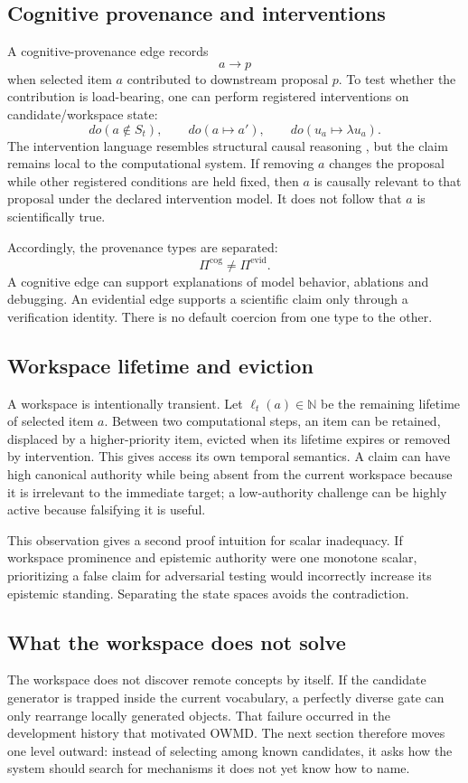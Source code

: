 \subsection{Cognitive provenance and interventions}

A cognitive-provenance edge records
\[
a\longrightarrow p
\]
when selected item \(a\) contributed to downstream proposal \(p\). To test whether the contribution is load-bearing, one can perform registered interventions on candidate/workspace state:
\[
do(a\notin S_t),\qquad do(a\mapsto a'),\qquad do(u_a\mapsto\lambda u_a).
\]
The intervention language resembles structural causal reasoning \cite{pearl2009,halpern2016}, but the claim remains local to the computational system. If removing \(a\) changes the proposal while other registered conditions are held fixed, then \(a\) is causally relevant to that proposal under the declared intervention model. It does not follow that \(a\) is scientifically true.

Accordingly, the provenance types are separated:
\[
\Pi^{\mathrm{cog}}\neq\Pi^{\mathrm{evid}}.
\]
A cognitive edge can support explanations of model behavior, ablations and debugging. An evidential edge supports a scientific claim only through a verification identity. There is no default coercion from one type to the other.

\subsection{Workspace lifetime and eviction}

A workspace is intentionally transient. Let \(\ell_t(a)\in\mathbb N\) be the remaining lifetime of selected item \(a\). Between two computational steps, an item can be retained, displaced by a higher-priority item, evicted when its lifetime expires or removed by intervention. This gives access its own temporal semantics. A claim can have high canonical authority while being absent from the current workspace because it is irrelevant to the immediate target; a low-authority challenge can be highly active because falsifying it is useful.

This observation gives a second proof intuition for scalar inadequacy. If workspace prominence and epistemic authority were one monotone scalar, prioritizing a false claim for adversarial testing would incorrectly increase its epistemic standing. Separating the state spaces avoids the contradiction.

\subsection{What the workspace does not solve}

The workspace does not discover remote concepts by itself. If the candidate generator is trapped inside the current vocabulary, a perfectly diverse gate can only rearrange locally generated objects. That failure occurred in the development history that motivated OWMD. The next section therefore moves one level outward: instead of selecting among known candidates, it asks how the system should search for mechanisms it does not yet know how to name.
